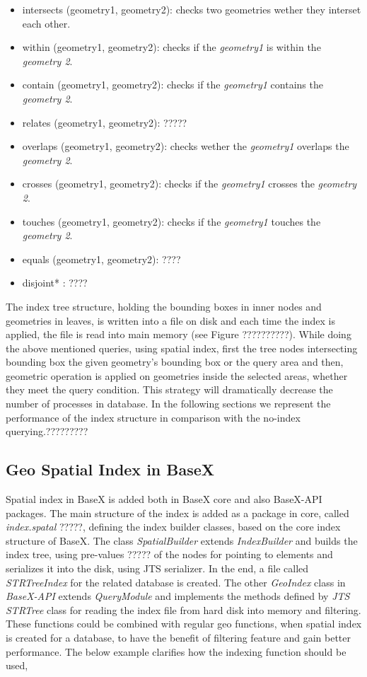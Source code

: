 \documentclass[a4paper,12pt]{article}
\begin{document}
\begin{itemize}
\item intersects (geometry1, geometry2): checks two geometries wether they interset each other.
\item within (geometry1, geometry2): checks if the \textit{geometry1} is within the \textit{geometry 2}.
\item contain (geometry1, geometry2): checks if the \textit{geometry1} contains the \textit{geometry 2}.
\item relates (geometry1, geometry2): ????? 
\item overlaps (geometry1, geometry2): checks wether the \textit{geometry1} overlaps the \textit{geometry 2}.
\item crosses (geometry1, geometry2): checks if the \textit{geometry1} crosses the \textit{geometry 2}.
\item touches (geometry1, geometry2): checks if the \textit{geometry1} touches the \textit{geometry 2}.
\item equals (geometry1, geometry2): ????
\item disjoint* : ????
\end{itemize}

The index tree structure, holding the bounding boxes in inner nodes and geometries in leaves, is written into a file on disk and each time the index is applied, the file is read into main memory (see Figure ??????????). While doing the above mentioned queries, using spatial index, first the tree nodes intersecting bounding box the given geometry's bounding box or the query area and then, geometric operation is applied on geometries inside the selected areas, whether they meet the query condition. This strategy will dramatically decrease the number of processes in database. In the following sections we represent the performance of the index structure in comparison with the no-index querying.?????????

\subsection{Geo Spatial Index in BaseX}
Spatial index in BaseX is added both in BaseX core and also BaseX-API packages. The main structure of the index is added as a package in core, called \textit{index.spatal} ?????, defining the index builder classes, based on the core index structure of BaseX. The class \textit{SpatialBuilder} extends \textit{IndexBuilder} and builds the index tree, using pre-values ????? of the nodes for pointing to elements and serializes it into the disk, using JTS serializer. In the end, a file called \textit{STRTreeIndex} for the related database is created. 
The other \textit{GeoIndex} class in \textit{BaseX-API} extends \textit{QueryModule} and implements the methods defined by \textit{JTS STRTree} class for reading the index file from hard disk into memory and filtering. These functions could be combined with regular geo functions, when spatial index is created for a database, to have the benefit of filtering feature and gain better performance. The below example clarifies how the indexing function should be used,
\end{document}
